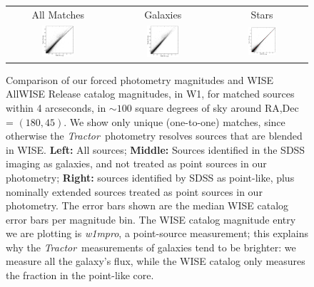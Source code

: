 \documentclass[12pt,preprint]{aastex}
\newcommand{\tractor}{\textsl{Tractor}}
\begin{document}
\begin{figure}
\begin{tabular}{@{}c@{}c@{}c@{}}
All Matches & Galaxies & Stars \\
\includegraphics[width=0.33\textwidth]{comp-16} &
\includegraphics[width=0.33\textwidth]{comp-17} &
\includegraphics[width=0.33\textwidth]{comp-18}
\end{tabular}
\caption{Comparison of our forced photometry magnitudes and WISE
  AllWISE Release catalog magnitudes, in W1, for matched sources
  within 4 arcseconds, in $\sim 100$ square degrees of sky around
  RA,Dec = $(180, 45)$.  We show only unique (one-to-one) matches,
  since otherwise the \tractor\ photometry resolves sources that are
  blended in WISE.  \textbf{Left:} All sources; \textbf{Middle:} Sources
  identified in the SDSS imaging as galaxies, and not treated as point
  sources in our photometry; \textbf{Right:} sources identified by SDSS
  as point-like, plus nominally extended sources treated as point
  sources in our photometry.  The error bars shown are the median WISE
  catalog error bars per magnitude bin.  The WISE catalog magnitude
  entry we are plotting is \emph{w1mpro}, a point-source measurement;
  this explains why the \tractor\ measurements of galaxies tend to be
  brighter: we measure all the galaxy's flux, while the WISE catalog
  only measures the fraction in the point-like core.
  \label{fig:comp}}
\end{figure}
\end{document}
